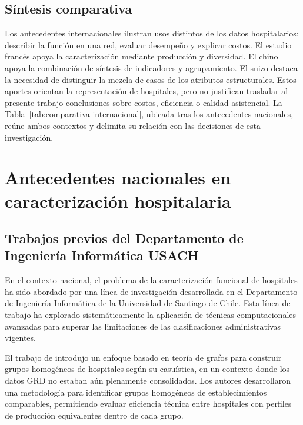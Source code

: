 \subsection{Síntesis comparativa}

\label{sec:sintesis-internacional}

Los antecedentes internacionales ilustran usos distintos de los datos
hospitalarios: describir la función en una red, evaluar desempeño y explicar
costos. El estudio francés apoya la caracterización mediante producción y
diversidad. El chino apoya la combinación de síntesis de indicadores y
agrupamiento. El suizo destaca la necesidad de distinguir la mezcla de casos
de los atributos estructurales. Estos aportes orientan la representación de hospitales, pero no
justifican trasladar al presente trabajo conclusiones sobre costos, eficiencia
o calidad asistencial. La Tabla~\ref{tab:comparativa-internacional}, ubicada
tras los antecedentes nacionales, reúne ambos contextos y delimita su relación
con las decisiones de esta investigación.

\section{Antecedentes nacionales en caracterización hospitalaria}
\label{sec:nacional}

\subsection{Trabajos previos del Departamento de Ingeniería Informática USACH}
\label{sec:usach}

En el contexto nacional, el problema de la caracterización funcional de
hospitales ha sido abordado por una línea de investigación desarrollada en el
Departamento de Ingeniería Informática de la Universidad de Santiago de Chile.
Esta línea de trabajo ha explorado sistemáticamente la aplicación de técnicas
computacionales avanzadas para superar las limitaciones de las clasificaciones
administrativas vigentes.

El trabajo de \citet{Villalobos2016} introdujo un enfoque basado en teoría de
grafos para construir grupos homogéneos de hospitales según su casuística, en
un contexto donde los datos GRD no estaban aún plenamente consolidados. Los
autores desarrollaron una metodología para identificar grupos homogéneos de
establecimientos comparables, permitiendo evaluar eficiencia técnica entre
hospitales con perfiles de producción equivalentes dentro de cada grupo.

